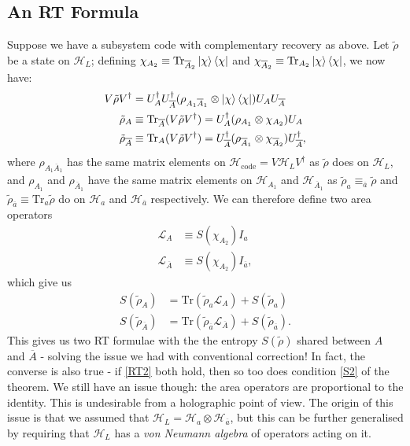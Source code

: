 \documentclass[12pt,a4paper]{report}
\numberwithin{equation}{section}
\newcommand{\ketbra}[2]{\ket{#1}\bra{#2}}
\newcommand{\ketbras}[1]{\ketbra{#1}{#1}}
\newcommand{\Hcode}{\mathcal{H}_{\text{code}}}
\newcommand{\ol}[1]{\overline{#1}}
\newcommand{\tr}{\text{Tr}}
\theoremstyle{definition}
\theoremstyle{theorem}
\theoremstyle{theorem}
\theoremstyle{example}
\theoremstyle{definition}
\begin{document}
\subsection{An RT Formula}
Suppose we have a subsystem code with complementary recovery as above. Let $\tilde{\rho}$ be a state on $\mathcal{H}_{L}$; defining $\chi_{A_{2}}\equiv\tr_{\ol{A}_{2}}\ketbras{\chi}$ and $\chi_{\ol{A}_{2}}\equiv\tr_{A_{2}}\ketbras{\chi}$, we now have:
\begin{equation}
	\begin{aligned}
		V\tilde{\rho}V^{\dagger}&=U_{A}^{\dagger}U_{\ol{A}}^{\dagger}(\rho_{A_{1}\ol{A}_{1}}\otimes\ketbras{\chi})U_{A}U_{\ol{A}}\\
		\tilde{\rho}_{A}&\equiv\tr_{\ol{A}}(V\tilde{\rho}V^{\dagger})=U_{A}^{\dagger}(\rho_{A_{1}}\otimes\chi_{A_{2}})U_{A}\\
		\tilde{\rho}_{\ol{A}}&\equiv\tr_{A}(V\tilde{\rho}V^{\dagger})=U_{\ol{A}}^{\dagger}(\rho_{\ol{A}_{1}}\otimes\chi_{\ol{A}_{2}})U_{\ol{A}}^{\dagger},
	\end{aligned}
\end{equation}
where $\rho_{A_{1}\ol{A}_{1}}$ has the same matrix elements on $\Hcode=V\mathcal{H}_{L}V^{\dagger}$ as $\tilde{\rho}$ does on $\mathcal{H}_{L}$, and $\rho_{A_{1}}$ and $\rho_{\ol{A}_{1}}$ have the same matrix elements on $\mathcal{H}_{A_{1}}$ and $\mathcal{H}_{\ol{A}_{1}}$ as $\tilde{\rho}_{a}\equiv_{\ol{a}}\tilde{\rho}$ and $\tilde{\rho}_{\ol{a}}\equiv\tr_{a}\tilde{\rho}$ do on $\mathcal{H}_{a}$ and $\mathcal{H}_{\ol{a}}$ respectively. We can therefore define two area operators
\begin{equation}
	\begin{aligned} 
		\mathcal{L}_{A}&\equiv S(\chi_{A_{2}})I_{a}\\
		\mathcal{L}_{\ol{A}}&\equiv S(\chi_{A_{2}})I_{\ol{a}},
	\end{aligned}
\end{equation}
which give us
\begin{equation}\label{RT2}
	\begin{aligned}
		S(\tilde{\rho}_{A})&=\tr(\tilde{\rho}_{a}\mathcal{L}_{A})+S(\tilde{\rho}_{a})\\
		S(\tilde{\rho}_{\ol{A}})&=\tr(\tilde{\rho}_{\ol{a}}\mathcal{L}_{\ol{A}})+S(\tilde{\rho}_{\ol{a}}).
	\end{aligned}
\end{equation}
This gives us two RT formulae with the the entropy $S(\tilde{\rho})$ shared between $A$ and $\ol{A}$ - solving the issue we had with conventional correction! In fact, the converse is also true - if \ref{RT2} both hold, then so too does condition \ref{S2} of the theorem. We still have an issue though: the area operators are proportional to the identity. This is undesirable from a holographic point of view. The origin of this issue is that we assumed that $\mathcal{H}_{L}=\mathcal{H}_{a}\otimes\mathcal{H}_{\ol{a}}$, but this can be further generalised by requiring that $\mathcal{H}_{L}$ has a \textit{von Neumann algebra} of operators acting on it.
\end{document}
